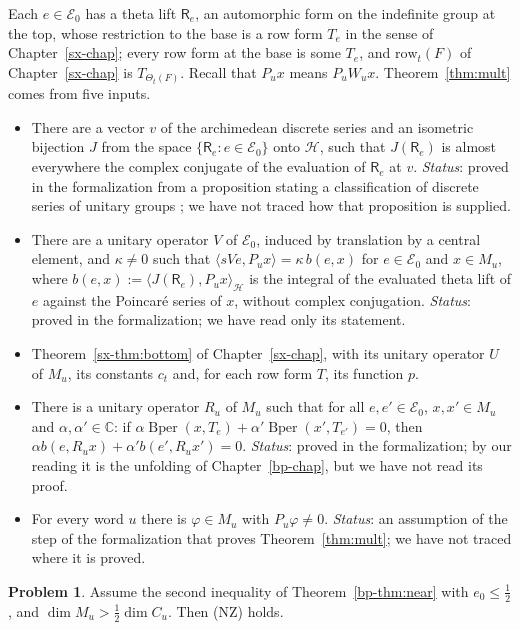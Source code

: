 \documentclass[reqno]{amsart}
\newcounter{chap}
\theoremstyle{definition}
\newtheorem{problem}{Problem}[section]
\theoremstyle{plain}
\theoremstyle{remark}
\newcommand{\C}{\mathbb C}
\newcommand{\Hc}{\mathcal H}
\newcommand{\Ec}{\mathcal E}
\newcommand{\Bper}{\operatorname{Bper}}
\begin{document}
Each \(e\in\Ec_0\) has a theta lift \(\mathsf R_e\), an automorphic form on the indefinite group at the top, whose restriction to the base is a row form \(T_e\) in the sense of Chapter~\ref{sx-chap}; every row form at the base is some \(T_e\), and \(\mathrm{row}_t(F)\) of Chapter~\ref{sx-chap} is \(T_{\Theta_t(F)}\).  Recall that \(P_ux\) means \(P_uW_ux\).  Theorem~\ref{thm:mult} comes from five inputs.
\begin{itemize}
\item[(E)] There are a vector \(v\) of the archimedean discrete series and an isometric bijection \(J\) from the space \(\{\mathsf R_e:e\in\Ec_0\}\) onto \(\Hc\), such that \(J(\mathsf R_e)\) is almost everywhere the complex conjugate of the evaluation of \(\mathsf R_e\) at \(v\).  \emph{Status}: proved in the formalization from a proposition stating a classification of discrete series of unitary groups \cite{HC}; we have not traced how that proposition is supplied.
\item[(Pa)] There are a unitary operator \(V\) of \(\Ec_0\), induced by translation by a central element, and \(\kappa\ne0\) such that \(\langle sVe,P_ux\rangle=\kappa\,b(e,x)\) for \(e\in\Ec_0\) and \(x\in M_u\), where \(b(e,x):=\langle J(\mathsf R_e),P_ux\rangle_\Hc\) is the integral of the evaluated theta lift of \(e\) against the Poincar\'e series of \(x\), without complex conjugation.  \emph{Status}: proved in the formalization; we have read only its statement.
\item[(J)] Theorem~\ref{sx-thm:bottom} of Chapter~\ref{sx-chap}, with its unitary operator \(U\) of \(M_u\), its constants \(c_t\) and, for each row form \(T\), its function \(p\).
\item[(Bo)] There is a unitary operator \(R_u\) of \(M_u\) such that for all \(e,e'\in\Ec_0\), \(x,x'\in M_u\) and \(\alpha,\alpha'\in\C\): if \(\alpha\Bper(x,T_e)+\alpha'\Bper(x',T_{e'})=0\), then \(\alpha b(e,R_ux)+\alpha'b(e',R_ux')=0\).  \emph{Status}: proved in the formalization; by our reading it is the unfolding of Chapter~\ref{bp-chap}, but we have not read its proof.
\item[(NZ)] For every word \(u\) there is \(\varphi\in M_u\) with \(P_u\varphi\ne0\).  \emph{Status}: an assumption of the step of the formalization that proves Theorem~\ref{thm:mult}; we have not traced where it is proved.
\end{itemize}

\begin{problem}\label{pr:nz}
Assume the second inequality of Theorem~\ref{bp-thm:near} with \(e_0\le\frac12\), and \(\dim M_u>\frac12\dim C_u\).  Then (NZ) holds.
\end{problem}
\end{document}
